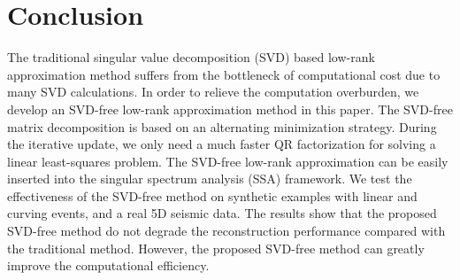 \section{Conclusion}
The traditional singular value decomposition (SVD) based low-rank approximation method suffers from the bottleneck of computational cost due to many SVD calculations. In order to relieve the computation overburden, we develop an SVD-free low-rank approximation method in this paper. The SVD-free matrix decomposition is based on an alternating minimization strategy. During the iterative update, we only need a much faster QR factorization for solving a linear least-squares problem. The SVD-free low-rank approximation can be easily inserted into the singular spectrum analysis (SSA) framework. We test the effectiveness of the SVD-free method on synthetic examples with linear and curving events,  and a real 5D seismic data. The results show that the proposed SVD-free method do not degrade the reconstruction performance compared with the traditional method. However, the proposed SVD-free method can greatly improve the computational efficiency. 








